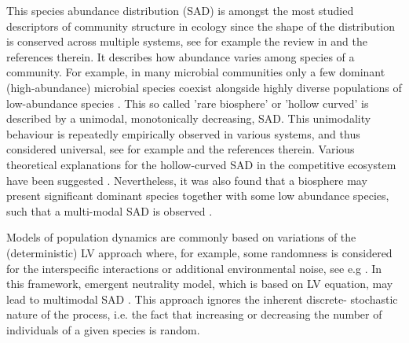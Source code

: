\documentclass[9pt,lineno]{elife}
\begin{document}
This species abundance distribution (SAD) is amongst the most studied descriptors of community structure in ecology since the shape of the distribution is conserved across multiple systems, see for example the review in \cite{leidinger2017biodiversity} and the references therein.
It describes how abundance varies among species of a community. 
For example, in many microbial communities only a few dominant (high-abundance) microbial species coexist alongside highly diverse populations of low-abundance species \cite{lynch2015ecology}. 
This so called 'rare biosphere' or 'hollow curved' is described by a unimodal, monotonically decreasing,  SAD. 
This unimodality behaviour is repeatedly empirically observed in various systems, and thus considered universal, see for example \cite{mcgill2007species,magurran2013measuring} and the references therein. 
Various theoretical explanations for the hollow-curved SAD in the competitive ecosystem have been suggested \cite{mcgill2007species,magurran2013measuring}. 
Nevertheless, it was also found that a biosphere may present significant dominant species together with some low abundance species, such that a multi-modal SAD is observed  \cite{hanski1982dynamics,scheiner1997placing,loreau1999immigration,segura2013competition,zhang2020lifting,vergnon2012emergent}.  

Models of population dynamics are commonly based on variations of the (deterministic) LV approach where, for example, some randomness is considered for the interspecific interactions or additional environmental noise, see e.g \cite{fisher2014transition,lynch2015ecology,verberk2011explaining,fowler2013colonization,barabas2016effect,tilman1982resource,kessler2015generalized}. 
In this framework, emergent neutrality model, which is based on LV equation, may lead to multimodal SAD \cite{vergnon2012emergent,scheffer2006self}. 
This approach ignores the inherent discrete- stochastic nature of the process, i.e. the fact that increasing or decreasing the number of individuals of a given species is random.
\end{document}
